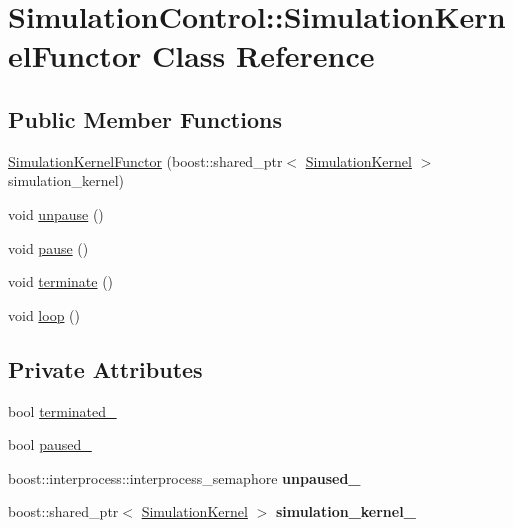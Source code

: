 \hypertarget{class_simulation_control_1_1_simulation_kernel_functor}{
\section{SimulationControl::SimulationKernelFunctor Class Reference}
\label{class_simulation_control_1_1_simulation_kernel_functor}
}
\subsection*{Public Member Functions}
\begin{CompactItemize}
\item 
\hyperlink{class_simulation_control_1_1_simulation_kernel_functor_5264e83328beeaafae7e87179614c436}{SimulationKernelFunctor} (boost::shared\_\-ptr$<$ \hyperlink{class_simulation_kernel}{SimulationKernel} $>$ simulation\_\-kernel)
\item 
void \hyperlink{class_simulation_control_1_1_simulation_kernel_functor_c23f51cedb9c10e346a7bb6a66ed98ab}{unpause} ()
\item 
void \hyperlink{class_simulation_control_1_1_simulation_kernel_functor_1228e457d2a780ba379b36e66f57e8cd}{pause} ()
\item 
void \hyperlink{class_simulation_control_1_1_simulation_kernel_functor_afb53670154b6460d79358f9b866ef24}{terminate} ()
\item 
void \hyperlink{class_simulation_control_1_1_simulation_kernel_functor_44aaca5c7b6605436b889d41cc4b9472}{loop} ()
\end{CompactItemize}
\subsection*{Private Attributes}
\begin{CompactItemize}
\item 
bool \hyperlink{class_simulation_control_1_1_simulation_kernel_functor_0803093cc15c83a7b85044ae2d630270}{terminated\_\-}
\item 
bool \hyperlink{class_simulation_control_1_1_simulation_kernel_functor_c0b1b92a6a04db5775afbcbae5a734ec}{paused\_\-}
\item 
\hypertarget{class_simulation_control_1_1_simulation_kernel_functor_d513c7e18afaed223c9477654d33638e}{
boost::interprocess::interprocess\_\-semaphore \textbf{unpaused\_\-}}
\label{class_simulation_control_1_1_simulation_kernel_functor_d513c7e18afaed223c9477654d33638e}

\item 
\hypertarget{class_simulation_control_1_1_simulation_kernel_functor_ee9b24898cfae41f76f8fd096cdcab24}{
boost::shared\_\-ptr$<$ \hyperlink{class_simulation_kernel}{SimulationKernel} $>$ \textbf{simulation\_\-kernel\_\-}}
\label{class_simulation_control_1_1_simulation_kernel_functor_ee9b24898cfae41f76f8fd096cdcab24}

\end{CompactItemize}


